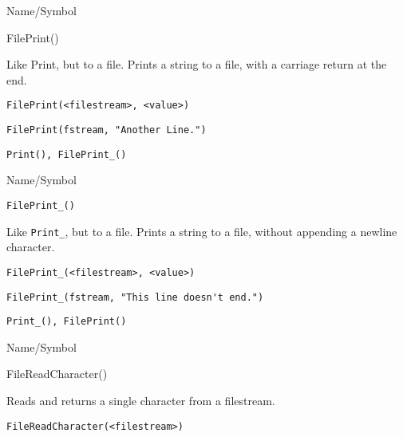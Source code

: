 \rl




\begin{desc}{Name/Symbol}
\item[Name/Symbol]	FilePrint()

\item[Description]	Like Print, but to a file.  Prints a string to a file, 
		with a carriage return at the end.
	
\item[Usage]
\begin{verbatim}
FilePrint(<filestream>, <value>)
\end{verbatim}

\item[Example]
\begin{verbatim}
FilePrint(fstream, "Another Line.")
\end{verbatim}

\item[See Also]	\verb+Print(), FilePrint_()+
\end{desc}

\rl




\begin{desc}{Name/Symbol}
\item[Name/Symbol]	\verb+FilePrint_()+

\item[Description]	Like \verb+Print_+, but to a file.  Prints a string to a file,	without appending a newline character.
	
\item[Usage]
\begin{verbatim}
FilePrint_(<filestream>, <value>)
\end{verbatim}

\item[Example]
\begin{verbatim}
FilePrint_(fstream, "This line doesn't end.")
\end{verbatim}

\item[See Also]	\verb+Print_(), FilePrint()+
\end{desc}

\rl




\begin{desc}{Name/Symbol}
\item[Name/Symbol]	FileReadCharacter()

\item[Description]	Reads and returns a single character from a filestream.

\item[Usage]
\begin{verbatim}
FileReadCharacter(<filestream>)
\end{verbatim}

\item[Example]	

\item[See Also]	
\end{desc}


